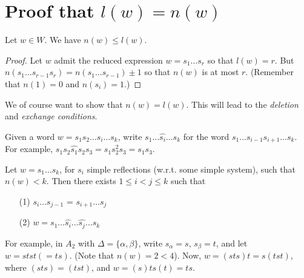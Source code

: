 \section{Proof that $l(w) = n(w)$}

\begin{lemma} \label{lem9}
Let $w \in W$. We have $n(w) \leq l(w)$.
\end{lemma}

\begin{proof}
Let $w$ admit the reduced expression $w = s_1 \dots s_r$ so that $l(w) = r$.
But $n(s_1 \dots s_{r-1} s_r) = n(s_1 \dots s_{r-1}) \pm 1$ so that $n(w)$ is
at most $r$. (Remember that $n(1) = 0$ and $n(s_i) = 1$.)
\end{proof}

We of course want to show that $n(w) = l(w)$. This will lead to the {\em deletion}
and {\em exchange conditions}.

Given a word $w = s_1 s_2 \dots s_i \dots s_k$, write
$
    s_1 \dots \hat{s_i} \dots s_k
$
for the word $s_1 \dots s_{i-1} s_{i+1} \dots s_k$. For example,
$
    s_1 s_2 \hat{s_1} s_2 s_3 = s_1 s_2^2 s_3 = s_1 s_3.
$

\begin{theorem} \label{thm10}
Let $w = s_1 \dots s_k$, for $s_i$ simple reflections (w.r.t. some simple
system), such that $n(w) < k$. Then there exists $1 \leq i < j \leq k$ such that
\begin{enumerate}
\item[(1)] $s_i \dots s_{j-1}$ = $s_{i+1} \dots s_{j}$
\item[(2)] $w = s_1 \dots \hat{s_i} \dots \hat{s_j} \dots s_k$
\end{enumerate}
\end{theorem}

For example, in $A_2$ with $\Delta = \{\alpha, \beta\}$, write $s_\alpha = s$,
$s_\beta = t$, and let $w = stst (= ts)$.
(Note that $n(w) = 2 < 4$). Now,
$w = (sts)t = s(tst)$,
where $(sts) = (tst)$, and
$w = (s)ts(t) = ts$.

